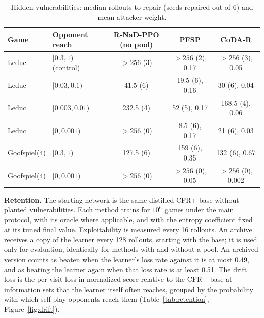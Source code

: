 \documentclass{article}
\theoremstyle{plain}
\theoremstyle{remark}
\newcommand{\codar}{CoDA-R}
\newcommand{\rnad}{R-NaD-PPO}
\begin{document}
\begin{table}[!htbp]
\caption{Hidden vulnerabilities: median rollouts to repair (seeds repaired out of 6) and mean attacker weight.}
\label{tab:hidden}
\begin{center}
\footnotesize
\begin{tabular}{llccc}
\toprule
Game & Opponent reach & \rnad{} (no pool) & PFSP & \codar{} \\
\midrule
Leduc & $[0.3,1)$ (control) & $>256$ (3) & $>256$ (2), 0.17 & $>256$ (3), 0.05 \\
Leduc & $[0.03,0.1)$ & 41.5 (6) & 19.5 (6), 0.16 & 30 (6), 0.04 \\
Leduc & $[0.003,0.01)$ & 232.5 (4) & 52 (5), 0.17 & 168.5 (4), 0.06 \\
Leduc & $[0,0.001)$ & $>256$ (0) & 8.5 (6), 0.17 & 21 (6), 0.03 \\
Goofspiel(4) & $[0.3,1)$ & 127.5 (6) & 159 (6), 0.35 & 132 (6), 0.67 \\
Goofspiel(4) & $[0,0.001)$ & $>256$ (0) & $>256$ (0), 0.05 & $>256$ (0), 0.002 \\
\bottomrule
\end{tabular}
\end{center}
\end{table}

\textbf{Retention.} The starting network is the same distilled CFR+ base without planted vulnerabilities. Each method trains for $10^6$ games under the main protocol, with its oracle where applicable, and with the entropy coefficient fixed at its tuned final value. Exploitability is measured every 16 rollouts. An archive receives a copy of the learner every 128 rollouts, starting with the base; it is used only for evaluation, identically for methods with and without a pool. An archived version counts as beaten when the learner's loss rate against it is at most 0.49, and as beating the learner again when that loss rate is at least 0.51. The drift loss is the per-visit loss in normalized score relative to the CFR+ base at information sets that the learner itself often reaches, grouped by the probability with which self-play opponents reach them (Table~\ref{tab:retention}, Figure~\ref{fig:drift}).
\end{document}
